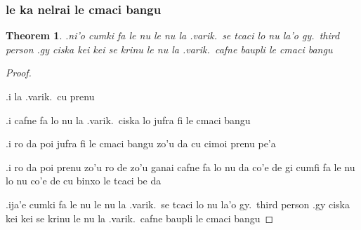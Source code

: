 \documentclass{article}
\newtheorem{thm}{Theorem}
\begin{document}
\subsubsection{le ka nelrai le cmaci bangu}
\begin{thm}
	.ni'o cumki fa le nu le nu la .varik.\ se tcaci lo nu la'o gy.\ third person .gy ciska kei kei se krinu le nu la .varik.\ cafne baupli le cmaci bangu
\end{thm}
\begin{proof}
	${ }$

	.i la .varik.\ cu prenu

	.i cafne fa lo nu la .varik.\ ciska lo jufra fi le cmaci bangu

	.i ro da poi jufra fi le cmaci bangu zo'u da cu cimoi prenu pe'a

	.i ro da poi prenu zo'u ro de zo'u ganai cafne fa lo nu da co'e de gi cumfi fa le nu lo nu co'e de cu binxo le tcaci be da

	.ija'e cumki fa le nu le nu la .varik.\ se tcaci lo nu la'o gy.\ third person .gy ciska kei kei se krinu le nu la .varik.\ cafne baupli le cmaci bangu
\end{proof}
\end{document}
